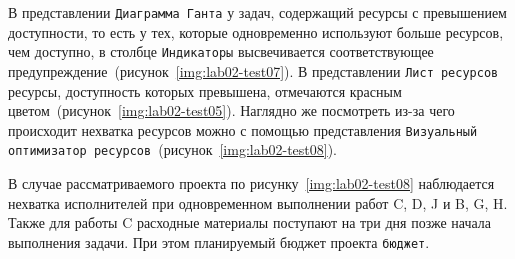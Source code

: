 В представлении \texttt{Диаграмма Ганта} у задач, содержащий ресурсы с
превышением доступности, то есть у тех, которые одновременно используют больше
ресурсов, чем доступно, в столбце \texttt{Индикаторы} высвечивается
соответствующее предупреждение~(рисунок~\ref{img:lab02-test07}). В представлении
\texttt{Лист ресурсов} ресурсы, доступность которых превышена, отмечаются
красным цветом~(рисунок~\ref{img:lab02-test05}). Наглядно же посмотреть из-за
чего происходит нехватка ресурсов можно с помощью представления
\texttt{Визуальный оптимизатор ресурсов}~(рисунок~\ref{img:lab02-test08}). 


В случае рассматриваемого проекта по рисунку~\ref{img:lab02-test08} наблюдается
нехватка исполнителей при одновременном выполнении работ C, D, J и B, G, H.
Также для работы C расходные материалы поступают на три дня позже начала
выполнения задачи. При этом планируемый бюджет проекта \texttt{бюджет}.
